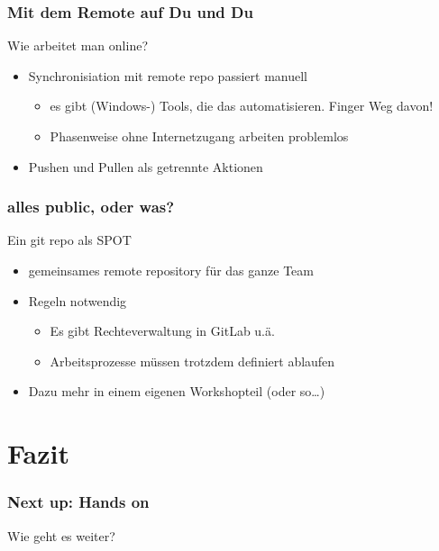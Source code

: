 \documentclass{beamer}
\begin{document}
\begin{frame}
	\frametitle{Mit dem Remote auf Du und Du}
	\begin{block}{Wie arbeitet man online?}
		\begin{itemize}
			\item Synchronisiation mit remote repo passiert manuell
				\pause
				\begin{itemize}
					\item es gibt (Windows-) Tools, die das automatisieren. Finger Weg davon!
					\item Phasenweise ohne Internetzugang arbeiten problemlos
				\end{itemize}
				\pause
			\item Pushen und Pullen als getrennte Aktionen
		\end{itemize}
	\end{block}
\end{frame}				

\begin{frame}
	\frametitle{alles public, oder was?}
	\begin{block}{Ein git repo als SPOT}
		\begin{itemize}
			\item gemeinsames remote repository für das ganze Team
				\pause
			\item Regeln notwendig
				\pause
				\begin{itemize}
					\item Es gibt Rechteverwaltung in GitLab u.ä.
					\item Arbeitsprozesse müssen trotzdem definiert ablaufen
				\end{itemize}
				\pause
			\item Dazu mehr in einem eigenen Workshopteil (oder so…)
		\end{itemize}
	\end{block}
\end{frame}

\section{Fazit}

\begin{frame}
	\frametitle{Next up: Hands on}
	\begin{center}
		Wie geht es weiter?
	\end{center}
\end{frame}


\end{document}
